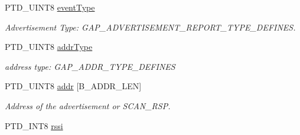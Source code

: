 \begin{DoxyCompactItemize}
\item 
\hypertarget{struct_o_b_s_e_r_v_e_r___i_n_f_o___m_e_s_s_a_g_e___t_aa406929bc3232dc32ced9055f61bde10}{}P\+T\+D\+\_\+\+U\+I\+N\+T8 \hyperlink{struct_o_b_s_e_r_v_e_r___i_n_f_o___m_e_s_s_a_g_e___t_aa406929bc3232dc32ced9055f61bde10}{event\+Type}\label{struct_o_b_s_e_r_v_e_r___i_n_f_o___m_e_s_s_a_g_e___t_aa406929bc3232dc32ced9055f61bde10}

\begin{DoxyCompactList}\small\item\em Advertisement Type\+: G\+A\+P\+\_\+\+A\+D\+V\+E\+R\+T\+I\+S\+E\+M\+E\+N\+T\+\_\+\+R\+E\+P\+O\+R\+T\+\_\+\+T\+Y\+P\+E\+\_\+\+D\+E\+F\+I\+N\+E\+S. \end{DoxyCompactList}\item 
\hypertarget{struct_o_b_s_e_r_v_e_r___i_n_f_o___m_e_s_s_a_g_e___t_a730452712ad963c16942398b82f17912}{}P\+T\+D\+\_\+\+U\+I\+N\+T8 \hyperlink{struct_o_b_s_e_r_v_e_r___i_n_f_o___m_e_s_s_a_g_e___t_a730452712ad963c16942398b82f17912}{addr\+Type}\label{struct_o_b_s_e_r_v_e_r___i_n_f_o___m_e_s_s_a_g_e___t_a730452712ad963c16942398b82f17912}

\begin{DoxyCompactList}\small\item\em address type\+: G\+A\+P\+\_\+\+A\+D\+D\+R\+\_\+\+T\+Y\+P\+E\+\_\+\+D\+E\+F\+I\+N\+E\+S \end{DoxyCompactList}\item 
\hypertarget{struct_o_b_s_e_r_v_e_r___i_n_f_o___m_e_s_s_a_g_e___t_a44b8aab5e220f6e5a32da5238e0c5237}{}P\+T\+D\+\_\+\+U\+I\+N\+T8 \hyperlink{struct_o_b_s_e_r_v_e_r___i_n_f_o___m_e_s_s_a_g_e___t_a44b8aab5e220f6e5a32da5238e0c5237}{addr} \mbox{[}B\+\_\+\+A\+D\+D\+R\+\_\+\+L\+E\+N\mbox{]}\label{struct_o_b_s_e_r_v_e_r___i_n_f_o___m_e_s_s_a_g_e___t_a44b8aab5e220f6e5a32da5238e0c5237}

\begin{DoxyCompactList}\small\item\em Address of the advertisement or S\+C\+A\+N\+\_\+\+R\+S\+P. \end{DoxyCompactList}\item 
\hypertarget{struct_o_b_s_e_r_v_e_r___i_n_f_o___m_e_s_s_a_g_e___t_aa43f4a895184a8a9dc970c71648c5c96}{}P\+T\+D\+\_\+\+I\+N\+T8 \hyperlink{struct_o_b_s_e_r_v_e_r___i_n_f_o___m_e_s_s_a_g_e___t_aa43f4a895184a8a9dc970c71648c5c96}{rssi}\label{struct_o_b_s_e_r_v_e_r___i_n_f_o___m_e_s_s_a_g_e___t_aa43f4a895184a8a9dc970c71648c5c96}


\end{DoxyCompactItemize}
